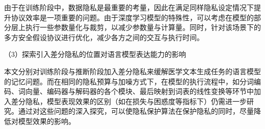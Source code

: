由于在训练阶段中，数据隐私是最重要的考量，因此在满足同样隐私设定情况下提升协议效率是一项重要的问题。由于深度学习模型的特殊性，可以考虑在模型的部分层上执行一些参数量化与裁剪，以减少参数量与计算量。同时，针对该场景下的多方安全假设协议进行优化，减少各方之间的交互与执行时间。

（3）探索引入差分隐私的位置对语言模型表达能力的影响

本文分别对训练阶段与推断阶段加入差分隐私来缓解医学文本生成任务的语言模型的记忆问题。而在相同的隐私预算与加噪方式下，在模型的执行流程中，如分词编码、词向量、编码器与解码器的各个模块、最后映射到词表的线性变换等环节中加入差分隐私，模型表现效果的区别（如在损失与困惑度等指标下）仍需进一步研究。通过对这些问题的深入探究，可以使隐私保护算法在保护隐私的同时，尽量降低对模型效果的影响。

